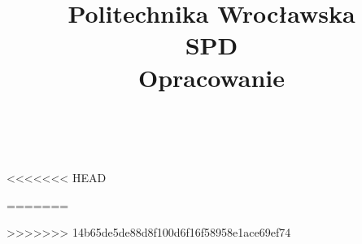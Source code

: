 \documentclass[a4paper,12pt]{article}
\title{\Huge \textbf{Politechnika Wrocławska\\[0.3in]} 
  \huge SPD \\[0.2in]
  \LARGE Opracowanie
}
\date{}
\author{
 	\quad	\\
}
\begin{document}
\maketitle
\pagebreak

\tableofcontents
\pagebreak









<<<<<<< HEAD

=======




>>>>>>> 14b65de5de88d8f100d6f16f58958e1ace69ef74
\end{document}
